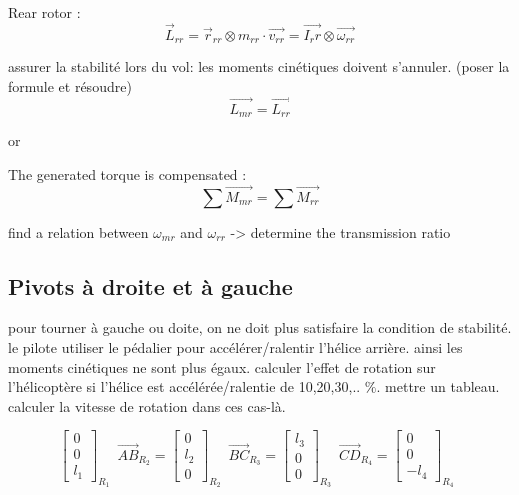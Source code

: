 \documentclass[12pt,a4paper]{article}
\begin{document}
Rear rotor : 
\begin{equation}
\vec{L}_{rr}=\vec{r}_{rr} \otimes m_{rr} \cdot \vec{v_{rr}}=\vec{I_rr} \otimes \vec{\omega_{rr}}
\end{equation}

assurer la stabilité lors du vol: les moments cinétiques doivent s'annuler. (poser la formule et résoudre)
\begin{equation}
\vec{L_{mr}}=\vec{L_{rr}}
\end{equation}

or

The generated torque is compensated : 
\begin{equation}
\sum \vec{M_{mr}}=\sum \vec{M_{rr}}
\end{equation}

find a relation between $\omega_{mr}$ and $\omega_{rr}$ -> determine the transmission ratio

\subsection{Pivots à droite et à gauche}
pour tourner à gauche ou doite, on ne doit plus satisfaire la condition de stabilité. le pilote utiliser le pédalier pour accélérer/ralentir l'hélice arrière. ainsi les moments cinétiques ne sont plus égaux.
\medbreak
calculer l'effet de rotation sur l'hélicoptère si l'hélice est accélérée/ralentie de 10,20,30,.. $\%$. mettre un tableau. calculer la vitesse de rotation dans ces cas-là. 


\begin{equation}
\begin{bmatrix}
0 \\
0\\
l_1
\end{bmatrix}_{R_{1}} \enspace
\vec{AB}_{R_{2}}=
\begin{bmatrix}
0 \\
l_2\\
0
\end{bmatrix}_{R_{2}} \enspace
\vec{BC}_{R_{3}}=
\begin{bmatrix}
l_3 \\
0\\
0
\end{bmatrix}_{R_{3}} \enspace
\vec{CD}_{R_{4}}=
\begin{bmatrix}
0 \\
0\\
-l_4
\end{bmatrix}_{R_{4}} \enspace
\end{equation}
\end{document}
